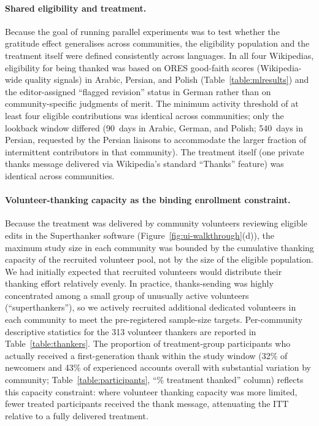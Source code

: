 \documentclass[9pt,twoside,lineno]{pnas-new}
\begin{document}
\paragraph{Shared eligibility and treatment.} Because the goal of running parallel experiments was to test whether the gratitude effect generalises across communities, the eligibility population and the treatment itself were defined consistently across languages. In all four Wikipedias, eligibility for being thanked was based on ORES good-faith scores (Wikipedia-wide quality signals) in Arabic, Persian, and Polish (Table~\ref{table:mlresults}) and the editor-assigned ``flagged revision'' status in German rather than on community-specific judgments of merit. The minimum activity threshold of at least four eligible contributions was identical across communities; only the lookback window differed (90~days in Arabic, German, and Polish; 540~days in Persian, requested by the Persian liaisons to accommodate the larger fraction of intermittent contributors in that community). The treatment itself (one private thanks message delivered via Wikipedia's standard ``Thanks'' feature) was identical across communities.

\paragraph{Volunteer-thanking capacity as the binding enrollment constraint.} Because the treatment was delivered by community volunteers reviewing eligible edits in the Superthanker software (Figure~\ref{fig:ui-walkthrough}(d)), the maximum study size in each community was bounded by the cumulative thanking capacity of the recruited volunteer pool, not by the size of the eligible population. We had initially expected that recruited volunteers would distribute their thanking effort relatively evenly. In practice, thanks-sending was highly concentrated among a small group of unusually active volunteers (``superthankers''), so we actively recruited additional dedicated volunteers in each community to meet the pre-registered sample-size targets. Per-community descriptive statistics for the 313 volunteer thankers are reported in Table~\ref{table:thankers}. The proportion of treatment-group participants who actually received a first-generation thank within the study window (32\% of newcomers and 43\% of experienced accounts overall with substantial variation by community; Table~\ref{table:participants}, ``\% treatment thanked'' column) reflects this capacity constraint: where volunteer thanking capacity was more limited, fewer treated participants received the thank message, attenuating the ITT relative to a fully delivered treatment.
\end{document}
